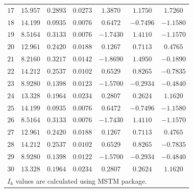 \documentclass[final, 3p]{elsarticle}
\begin{document}
\begin{table}[h]
\begin{center}
\begin{tabular}{|c|c|c|c|c|c|c|}
$17$ & $15.957$ & $0.2893$ & $0.0273$ & $ 1.3870$ & $ 1.1750$ & $ 1.7260$ \\
$18$ & $14.199$ & $0.0935$ & $0.0076$ & $ 0.6472$ & $-0.7496$ & $-1.1580$ \\
$19$ & $8.5164$ & $0.3133$ & $0.0076$ & $-1.7430$ & $ 1.4110$ & $-1.1570$ \\
$20$ & $12.961$ & $0.2420$ & $0.0188$ & $ 0.1267$ & $ 0.7113$ & $ 0.4765$ \\
$21$ & $8.2160$ & $0.3217$ & $0.0142$ & $-1.8690$ & $ 1.4950$ & $-0.1890$ \\
$22$ & $14.212$ & $0.2537$ & $0.0102$ & $ 0.6529$ & $ 0.8265$ & $-0.7835$ \\
$23$ & $8.9280$ & $0.1398$ & $0.0123$ & $-1.5700$ &	$-0.2934$ & $-0.4840$ \\
$24$ & $13.328$ & $0.1964$ & $0.0234$ & $ 0.2807$ & $ 0.2624$ & $ 1.1620$ \\
$25$ & $14.199$ & $0.0935$ & $0.0076$ & $ 0.6472$ & $-0.7496$ & $-1.1580$ \\
$26$ & $8.5164$ & $0.3133$ & $0.0076$ & $-1.7430$ & $ 1.4110$ & $-1.1570$ \\
$27$ & $12.961$ & $0.2420$ & $0.0188$ & $ 0.1267$ & $ 0.7113$ & $ 0.4765$ \\
$28$ & $14.212$ & $0.2537$ & $0.0102$ & $ 0.6529$ & $ 0.8265$ & $-0.7835$ \\
$29$ & $8.9280$ & $0.1398$ & $0.0122$ & $-1.5700$ & $-0.2934$ & $-0.4840$ \\
$30$ & $13.328$ & $0.1964$ & $0.0234$ & $ 0.2807$ & $ 0.2624$ & $ 1.1620$ \\
\hline\hline
\multicolumn{7}{l}{\small *$I_k$ values are calculated using MSTM package.}
\end{tabular}
\end{center}
\end{table}


\end{document}
